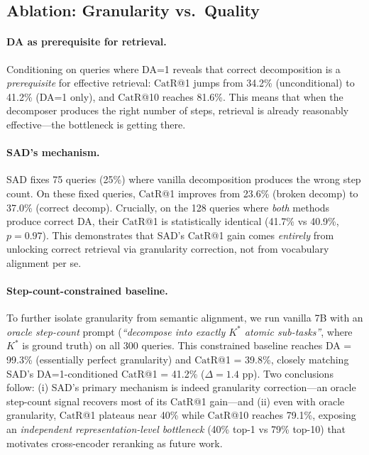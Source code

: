 \documentclass[11pt]{article}
\newcommand{\catrecall}{\text{CatR}}
\begin{document}
\subsection{Ablation: Granularity vs.\ Quality}

\paragraph{DA as prerequisite for retrieval.}
Conditioning on queries where DA=1 reveals that correct decomposition is a \emph{prerequisite} for effective retrieval: $\catrecall$@1 jumps from 34.2\% (unconditional) to 41.2\% (DA=1 only), and $\catrecall$@10 reaches 81.6\%.
This means that when the decomposer produces the right number of steps, retrieval is already reasonably effective---the bottleneck is getting there.

\paragraph{SAD's mechanism.}
SAD fixes 75 queries (25\%) where vanilla decomposition produces the wrong step count.
On these fixed queries, $\catrecall$@1 improves from 23.6\% (broken decomp) to 37.0\% (correct decomp).
Crucially, on the 128 queries where \emph{both} methods produce correct DA, their $\catrecall$@1 is statistically identical (41.7\% vs 40.9\%, $p{=}0.97$).
This demonstrates that SAD's $\catrecall$@1 gain comes \emph{entirely} from unlocking correct retrieval via granularity correction, not from vocabulary alignment per se.

\paragraph{Step-count-constrained baseline.}
To further isolate granularity from semantic alignment, we run vanilla 7B with an \emph{oracle step-count} prompt (\textit{``decompose into exactly $K^{*}$ atomic sub-tasks''}, where $K^{*}$ is ground truth) on all 300 queries.
This constrained baseline reaches DA = 99.3\% (essentially perfect granularity) and $\catrecall$@1 = 39.8\%, closely matching SAD's DA=1-conditioned $\catrecall$@1 = 41.2\% ($\Delta=1.4$ pp).
Two conclusions follow: (i) SAD's primary mechanism is indeed granularity correction---an oracle step-count signal recovers most of its $\catrecall$@1 gain---and (ii) even with oracle granularity, $\catrecall$@1 plateaus near 40\% while $\catrecall$@10 reaches 79.1\%, exposing an \emph{independent representation-level bottleneck} (40\% top-1 vs 79\% top-10) that motivates cross-encoder reranking as future work.
\end{document}
